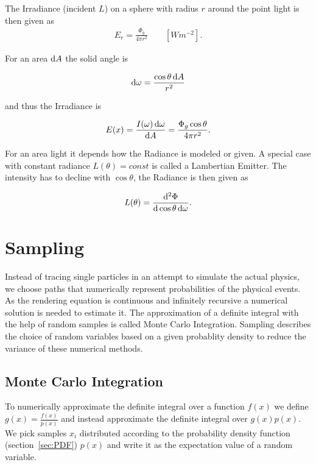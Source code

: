 The Irradiance (incident $L$) on a sphere with radius $r$ around the point light is then given as
\begin{align}
E_r =  \frac{\Phi_g}{4\pi r^2} \qquad [ W m^{-2} ] .
\end{align}

For an area $\mathop{}\!\mathrm{d} A$ the solid angle is 

\begin{align}
\mathop{}\!\mathrm{d} \omega = \frac{\cos \theta \mathop{}\!\mathrm{d} A}{r^2}  
\end{align}


and thus the Irradiance is

\begin{align}
E(x) = \frac{ I(\omega) \mathop{}\!\mathrm{d} \omega }{ \mathop{}\!\mathrm{d} A } = \frac{ \Phi_g \cos \theta }{ 4 \pi r^2}.
\end{align}

For an area light it depends how the Radiance is modeled or given. A special case with constant radiance $L(\theta) = const$ is called a Lambertian Emitter. The intensity has to decline with $\cos\theta$, the Radiance is then given as 

\begin{align}
L(\theta) = \frac{\mathop{}\!\mathrm{d}^2\Phi}{\mathop{}\!\mathrm{d}\cos\theta\mathop{}\!\mathrm{d}\omega}.
\end{align}



\section{Sampling}

Instead of tracing single particles in an attempt to simulate the actual physics, we choose paths that numerically represent probabilities of the physical events.  As the rendering equation is continuous and infinitely recursive a numerical solution is needed to estimate it. The approximation of a definite integral with the help of random samples is called Monte Carlo Integration. Sampling describes the choice of random variables based on a given probablity density to reduce the variance of these numerical methods.

\subsection{Monte Carlo Integration}
\label{sec:montecarlo}
\label{sec:MC}

To numerically approximate the definite integral over a function $f(x)$ we define $g(x) = \frac{f(x)}{p(x)}$ and instead approximate the definite integral over $g(x)p(x)$. We pick samples $x_i$ distributed according to the probability density function (section~\ref{sec:PDF}) $p(x)$ and write it as the expectation value of a random variable.

